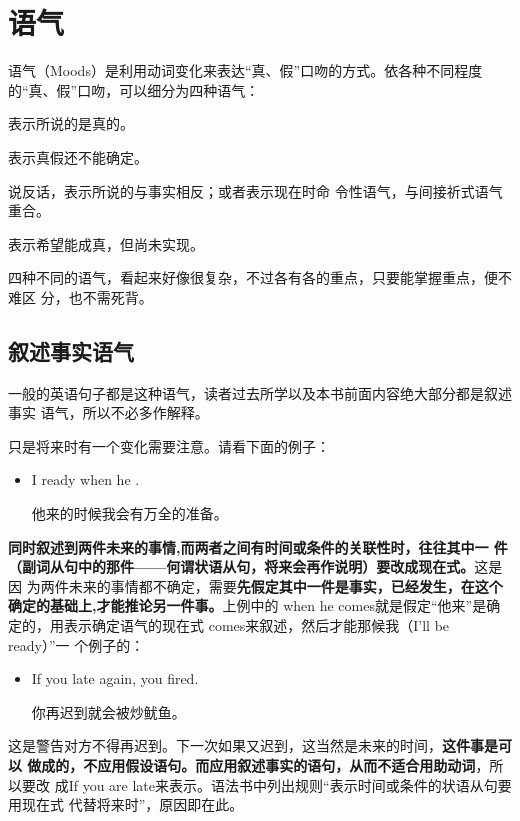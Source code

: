 \chapter{语气}

语气（Moods）是利用动词变化来表达“真、假”口吻的方式。依各种不同程度的“真、假”口吻，可以细分为四种语气：
\begin{description}[style=standard]
\item [叙述事实语气 (Indicative)] 表示所说的是真的。
\item [条件语气 (Conditional)] 表示真假还不能确定。
\item [虚拟语气 (Subjunctive)] 说反话，表示所说的与事实相反；或者表示现在时命
  令性语气，与间接祈式语气重合。
\item [祈使语气 (Imperative)] 表示希望能成真，但尚未实现。
\end{description}

四种不同的语气，看起来好像很复杂，不过各有各的重点，只要能掌握重点，便不难区
分，也不需死背。

\section{叙述事实语气}

一般的英语句子都是这种语气，读者过去所学以及本书前面内容绝大部分都是叙述事实
语气，所以不必多作解释。

只是将来时有一个变化需要注意。请看下面的例子：
\begin{itemize}
\item  I ready when he .

  他来的时候我会有万全的准备。
\end{itemize}
\textbf{同时叙述到两件未来的事情,而两者之间有时间或条件的关联性时，往往其中一
  件（副词从句中的那件——何谓状语从句，将来会再作说明）要改成现在式。}这是因
为两件未来的事情都不确定，需要\textbf{先假定其中一件是事实，已经发生，在这个
  确定的基础上,才能推论另一件事。}上例中的 when he comes就是假定“他来”是确
定的，用表示确定语气的现在式 comes来叙述，然后才能那候我（I'll be ready）”一
个例子的：
\begin{itemize}
\item  If you  late again, you fired.

  你再迟到就会被炒鱿鱼。
\end{itemize}
这是警告对方不得再迟到。下一次如果又迟到，这当然是未来的时间，\textbf{这件事是可以
  做成的，不应用假设语句。而应用叙述事实的语句，从而不适合用助动词}，所以要改
成If you are late来表示。语法书中列出规则“表示时间或条件的状语从句要用现在式
代替将来时”，原因即在此。

